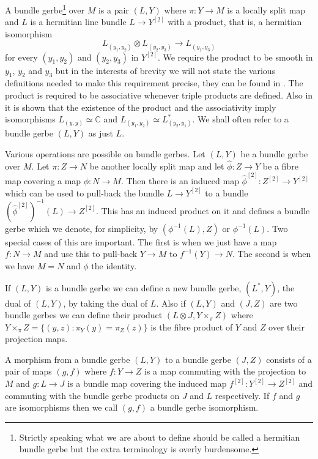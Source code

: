 \documentclass[a4paper,reqno]{amsart}
\theoremstyle{plain}
\theoremstyle{definition}
\theoremstyle{remark}
\numberwithin{equation}{section}
\numberwithin{figure}{section}
\newcommand{\CC}{{\mathbb C}}
\newcommand{\<}{\langle}
\renewcommand{\>}{\rangle}
\begin{document}
A bundle gerbe\footnote{Strictly speaking what we are about to define
should be called a hermitian  bundle gerbe but the extra terminology is
overly burdensome.} over $M$ is a pair $(L, Y)$ where
$\pi \colon Y \to M$ is a locally split map and
$L$ is a hermitian line bundle $L \to Y^{[2]}$ with a product, that is,
a hermitian  isomorphism
$$
L_{(y_1, y_2)} \otimes L_{(y_2, y_3)} \to L_{(y_1, y_3)}
$$
for every $(y_1, y_2)$ and $(y_2, y_3)$ in $Y^{[2]}$.
We require the product to be smooth in $y_1$, $y_2$ and
$y_3$ but in the interests of brevity we will not state the various
definitions needed to make this requirement precise, they  can be found in
\cite{Mur}.
The product is required to be
associative whenever triple products are defined. Also in \cite{Mur}
it is shown that the existence of the product and the associativity
imply isomorphisms $L_{(y, y)} \simeq \CC$ and $L_{(y_1, y_2)} \simeq
L_{(y_2, y_1)}^*$. We shall
often refer to a bundle gerbe $(L, Y)$ as just $L$.

Various operations are possible on bundle gerbes.  Let $(L, Y)$
be a bundle gerbe over $M$.
Let $\pi \colon Z \to N$ be another locally split map
and let  $\hat\phi \colon Z \to Y$ be a fibre map covering
a map $\phi \colon N \to M$.  Then there is an induced map
${\hat \phi}^{[2]} \colon Z^{[2]} \to Y^{[2]}$ which can
          be used to pull-back the bundle $L \to Y^{[2]}$ to a bundle
$({\hat\phi}^{[2]})^{-1}(L) \to Z^{[2]}$.  This has an induced product on it
and defines a bundle gerbe which we denote, for simplicity,
by $(\phi^{-1}(L), Z)$ or $\phi^{-1}(L)$.  Two special cases
of this are important. The first is when we just have a map
          $f\colon N \to M$ and use this to pull-back $Y \to M$ to
$f^{-1}(Y) \to N$. The second is when we have $M = N$ and
$\phi$ the identity.

If $(L, Y)$ is a bundle gerbe  we can define a
new bundle gerbe, $(L^*, Y)$, the dual of $(L, Y)$, by taking
the dual of $L$.
Also if  $(L, Y)$ and $(J, Z)$ are two bundle gerbes we can define their
product $(L\otimes J,  Y\times_\pi Z)$ where $Y\times_\pi Z
=\{ (y, z) \colon \pi_Y(y) = \pi_Z(z) \} $ is
the fibre product of $Y$ and $Z$ over their projection maps.

A morphism from a bundle gerbe  $(L, Y)$ to a bundle
gerbe  $(J, Z)$ consists of a pair of maps $(g, f)$ where
           $f \colon Y \to Z$ is a map commuting with the
projection to $M$ and  $g \colon L \to J$ is a bundle map covering the
induced map $f^{[2]} \colon Y^{[2]} \to Z^{[2]}$ and commuting with the
bundle gerbe products on $J$ and $L$ respectively. If $f$ and $g$ are
isomorphisms
then we call $(g, f)$ a bundle gerbe isomorphism.
\end{document}
